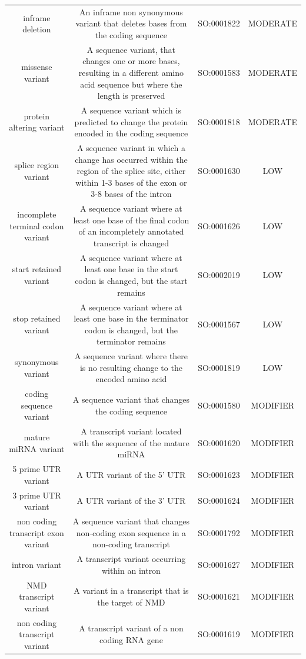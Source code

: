 {\begin{table}
\begin{adjustbox}{width=1\textwidth}
\begin{tabular}{c c c c}
inframe deletion & An inframe non synonymous variant that deletes bases from the coding sequence & SO:0001822 & MODERATE \\
missense variant & A sequence variant, that changes one or more bases, resulting in a different amino acid sequence but where the length is preserved & SO:0001583 & MODERATE \\
protein altering variant & A sequence variant which is predicted to change the protein encoded in the coding sequence & SO:0001818 & MODERATE \\
splice region variant & A sequence variant in which a change has occurred within the region of the splice site, either within 1-3 bases of the exon or 3-8 bases of the intron & SO:0001630 & LOW \\
incomplete terminal codon variant & A sequence variant where at least one base of the final codon of an incompletely annotated transcript is changed & SO:0001626 & LOW \\
start retained variant & A sequence variant where at least one base in the start codon is changed, but the start remains & SO:0002019 & LOW \\
stop retained variant & A sequence variant where at least one base in the terminator codon is changed, but the terminator remains & SO:0001567 & LOW \\
synonymous variant & A sequence variant where there is no resulting change to the encoded amino acid & SO:0001819 & LOW \\
coding sequence variant & A sequence variant that changes the coding sequence & SO:0001580 & MODIFIER \\
mature miRNA variant & A transcript variant located with the sequence of the mature miRNA & SO:0001620 & MODIFIER \\
5 prime UTR variant & A UTR variant of the 5' UTR & SO:0001623 & MODIFIER \\
3 prime UTR variant & A UTR variant of the 3' UTR & SO:0001624 & MODIFIER \\
non coding transcript exon variant & A sequence variant that changes non-coding exon sequence in a non-coding transcript & SO:0001792 & MODIFIER \\
intron variant & A transcript variant occurring within an intron & SO:0001627 & MODIFIER \\
NMD transcript variant & A variant in a transcript that is the target of NMD & SO:0001621 & MODIFIER \\
non coding transcript variant & A transcript variant of a non coding RNA gene & SO:0001619 & MODIFIER \\

\end{tabular}
\end{adjustbox}
\end{table}}
